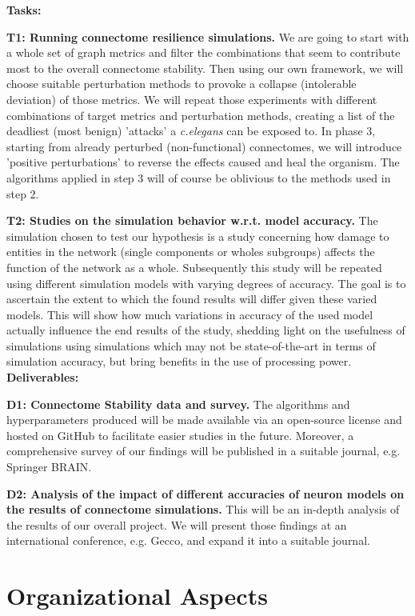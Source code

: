 \documentclass[a4paper,11pt]{article}
\begin{document}
\textbf{Tasks:}

\textbf{T1: Running connectome resilience simulations.} 
We are going to start with a whole set of graph metrics and filter the combinations that seem to contribute most to the overall connectome stability. Then using our own framework, we will choose suitable perturbation methods to provoke a collapse (intolerable deviation) of those metrics. We will repeat those experiments with different combinations of target metrics and perturbation methods, creating a list of the deadliest (most benign) 'attacks' a \emph{c.elegans} can be exposed to. In phase 3, starting from already perturbed (non-functional) connectomes, we will introduce 'positive perturbations' to reverse the effects caused and heal the organism. The algorithms applied in step 3 will of course be oblivious to the methods used in step 2.


\textbf{T2: Studies on the simulation behavior w.r.t. model accuracy.}
The simulation chosen to test our hypothesis is a study concerning how damage to entities in the network (single components or wholes subgroups) affects the function of the network as a whole. Subsequently this study will be repeated using different simulation models with varying degrees of accuracy. The goal is to ascertain the extent to which the found results will differ given these varied models. This will show how much variations in accuracy of the used model actually influence the end results of the study, shedding light on the usefulness of simulations using simulations which may not be state-of-the-art in terms of simulation accuracy, but bring benefits in the use of processing power.
\\[0,2cm]
\textbf{Deliverables:} 

\textbf{D1: Connectome Stability data and survey.}
The algorithms and hyperparameters produced will be made available via an open-source license and hosted on GitHub to facilitate easier studies in the future. Moreover, a comprehensive survey of our findings will be published in a suitable journal, e.g. Springer BRAIN.

\textbf{D2: Analysis of the impact of different accuracies of neuron models on the results of connectome simulations.} This will be an in-depth analysis of the results of our overall project. We will present those findings at an international conference, e.g. Gecco, and expand it into a suitable journal.


\section{Organizational Aspects}
\end{document}
